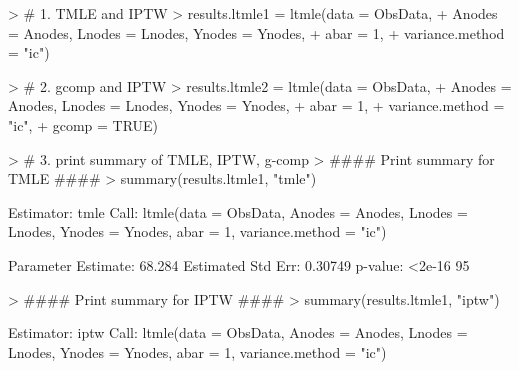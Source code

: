 \documentclass[answers]{exam}
\begin{document}

\begin{solution}
\begin{Schunk}
\begin{Sinput}
> # 1. TMLE and IPTW
> results.ltmle1 = ltmle(data = ObsData, 
+                        Anodes = Anodes, Lnodes = Lnodes, Ynodes = Ynodes, 
+                        abar = 1, 
+                        variance.method = "ic")
\end{Sinput}
\end{Schunk}
\begin{Schunk}
\begin{Sinput}
> # 2. gcomp and IPTW
> results.ltmle2 = ltmle(data = ObsData, 
+                        Anodes = Anodes, Lnodes = Lnodes, Ynodes = Ynodes, 
+                        abar = 1, 
+                        variance.method = "ic", 
+                        gcomp = TRUE)
\end{Sinput}
\end{Schunk}
\begin{Schunk}
\begin{Sinput}
> # 3. print summary of TMLE, IPTW, g-comp
> #### Print summary for TMLE ####
> summary(results.ltmle1, "tmle")
\end{Sinput}
\begin{Soutput}
Estimator:  tmle 
Call:
ltmle(data = ObsData, Anodes = Anodes, Lnodes = Lnodes, Ynodes = Ynodes, 
    abar = 1, variance.method = "ic")

   Parameter Estimate:  68.284 
    Estimated Std Err:  0.30749 
              p-value:  <2e-16 
    95%
\end{Soutput}
\end{Schunk}
\begin{Schunk}
\begin{Sinput}
> #### Print summary for IPTW ####
> summary(results.ltmle1, "iptw")
\end{Sinput}
\begin{Soutput}
Estimator:  iptw 
Call:
ltmle(data = ObsData, Anodes = Anodes, Lnodes = Lnodes, Ynodes = Ynodes, 
    abar = 1, variance.method = "ic")


\end{Soutput}
\end{Schunk}
\end{solution}
\end{document}
